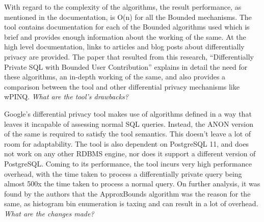 \documentclass[acmsmall]{acmart}
\begin{document}
With regard to the complexity of the algorithms, the result performance, as mentioned in the documentation, is O(n) for all the Bounded mechanisms. The tool contains documentation for each of the Bounded algorithms used which is brief and provides enough information about the working of the same. At the high level documentation, links to articles and blog posts about differentially privacy are provided. The paper that resulted from this research, “Differentially Private SQL with Bounded User Contribution” explains in detail the need for these algorithms, an in-depth working of the same, and also provides a comparison between the tool and other differential privacy mechanisms like wPINQ.
\newline
\newline
\newline
\textit{What are the tool’s drawbacks?}

Google’s differential privacy tool makes use of algorithms defined in a way that leaves it incapable of assessing normal SQL queries. Instead, the ANON version of the same is required to satisfy the tool semantics. This doesn’t leave a lot of room for adaptability. The tool is also dependent on PostgreSQL 11, and does not work on any other RDBMS engine, nor does it support a different version of PostgreSQL. 
Coming to its performance, the tool incurs very high performance overhead, with the time taken to process a differentially private query being almost 500x the time taken to process a normal query. On further analysis, it was found by the authors that the ApproxBounds algorithm was the reason for the same, as histogram bin enumeration is taxing and can result in a lot of overhead.
\newline
\newline
\textit{What are the changes made?}
\end{document}
